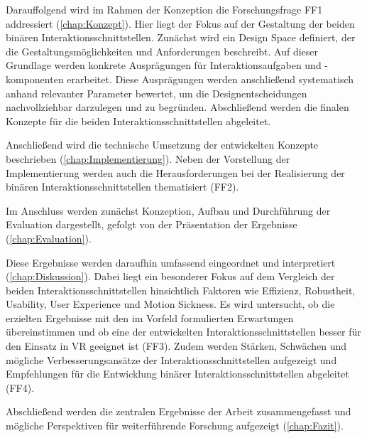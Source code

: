 Darauffolgend wird im Rahmen der Konzeption die Forschungsfrage FF1 addressiert (\autoref{chap:Konzept}). Hier liegt der Fokus auf der Gestaltung der beiden binären Interaktionsschnittstellen. Zunächst wird ein Design Space definiert, der die Gestaltungsmöglichkeiten und Anforderungen beschreibt. Auf dieser Grundlage werden konkrete Ausprägungen für Interaktionsaufgaben und -komponenten erarbeitet. Diese Ausprägungen werden anschließend systematisch anhand relevanter Parameter bewertet, um die Designentscheidungen nachvollziehbar darzulegen und zu begründen. Abschließend werden die finalen Konzepte für die beiden Interaktionsschnittstellen abgeleitet.

Anschließend wird die technische Umsetzung der entwickelten Konzepte beschrieben (\autoref{chap:Implementierung}). Neben der Vorstellung der Implementierung werden auch die Herausforderungen bei der Realisierung der binären Interaktionsschnittstellen thematisiert (FF2).

Im Anschluss werden zunächst Konzeption, Aufbau und Durchführung der Evaluation dargestellt, gefolgt von der Präsentation der Ergebnisse (\autoref{chap:Evaluation}).

Diese Ergebnisse werden daraufhin umfassend eingeordnet und interpretiert (\autoref{chap:Diskussion}). Dabei liegt ein besonderer Fokus auf dem Vergleich der beiden Interaktionsschnittstellen hinsichtlich Faktoren wie Effizienz, Robustheit, Usability, User Experience und Motion Sickness. Es wird untersucht, ob die erzielten Ergebnisse mit den im Vorfeld formulierten Erwartungen übereinstimmen und ob eine der entwickelten Interaktionsschnittstellen besser für den Einsatz in VR geeignet ist (FF3). Zudem werden Stärken, Schwächen und mögliche Verbesserungsansätze der Interaktionsschnittstellen aufgezeigt und Empfehlungen für die Entwicklung binärer Interaktionsschnittstellen abgeleitet (FF4). 

Abschließend werden die zentralen Ergebnisse der Arbeit zusammengefasst und mögliche Perspektiven für weiterführende Forschung aufgezeigt (\autoref{chap:Fazit}).
